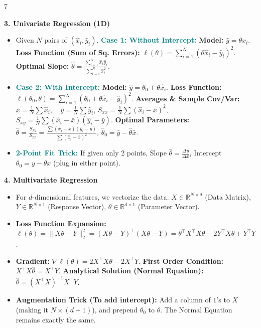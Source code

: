\documentclass{article}
\newcommand{\hlhighlight}[1]{\par\vspace{1.5pt}\noindent\colorbox{yellow!50}{\parbox{\dimexpr\columnwidth-2\fboxsep\relax}{\textbf{#1}}}\par\vspace{0.5pt}}
\newcommand{\sectitle}[1]{\par\textbf{\color{blue!70!black}{#1}}\par}
\newcommand{\concept}[1]{\textcolor{teal}{\textbf{#1}}}
\newcommand{\lbl}[1]{\textcolor{green!60!black}{\textbf{#1}}}
\begin{document}
\begin{multicols}{7}
\hlhighlight{3. Univariate Regression (1D)}
\sectitle{Without Intercept \& With Intercept}
\begin{itemize}
    \item Given $N$ pairs of $(\hat{x}_i, \hat{y}_i)$. \concept{Case 1: Without Intercept:} \lbl{Model:} $\hat{y} = \theta \hat{x}_i$. \lbl{Loss Function (Sum of Sq. Errors):} $\ell(\theta) = \sum_{i=1}^N (\theta\hat{x}_i - \hat{y}_i)^2$. \lbl{Optimal Slope:} $\hat{\theta} = \frac{\sum_{i=1}^N \hat{x}_i \hat{y}_i}{\sum_{i=1}^N \hat{x}_i^2}$.
    \item \concept{Case 2: With Intercept:} \lbl{Model:} $\hat{y} = \theta_0 + \theta \hat{x}_i$. \lbl{Loss Function:} $\ell(\theta_0, \theta) = \sum_{i=1}^N (\theta_0 + \theta\hat{x}_i - \hat{y}_i)^2$. \lbl{Averages \& Sample Cov/Var:} $\bar{x} = \frac{1}{N}\sum \hat{x}_i, \quad \bar{y} = \frac{1}{N}\sum \hat{y}_i$, $S_{xx} = \frac{1}{N}\sum (\hat{x}_i - \bar{x})^2$, $S_{xy} = \frac{1}{N}\sum (\hat{x}_i - \bar{x})(\hat{y}_i - \bar{y})$. \lbl{Optimal Parameters:} $\hat{\theta} = \frac{S_{xy}}{S_{xx}} = \frac{\sum (\hat{x}_i - \bar{x})(\hat{y}_i - \bar{y})}{\sum (\hat{x}_i - \bar{x})^2}$, $\hat{\theta}_0 = \bar{y} - \hat{\theta}\bar{x}$.
    \item \concept{2-Point Fit Trick:} If given only 2 points, Slope $\hat{\theta} = \frac{\Delta y}{\Delta x}$, Intercept $\theta_0 = y - \hat{\theta}x$ (plug in either point).
\end{itemize}

\hlhighlight{4. Multivariate Regression}
\sectitle{Vectorized Form \& Solutions}
\begin{itemize}
    \item For $d$-dimensional features, we vectorize the data. $X \in \mathbb{R}^{N \times d}$ (Data Matrix), $Y \in \mathbb{R}^{N \times 1}$ (Response Vector), $\theta \in \mathbb{R}^{d \times 1}$ (Parameter Vector).
    \item \lbl{Loss Function Expansion:} $\ell(\theta) = \|X\theta - Y\|_2^2 = (X\theta - Y)^\top (X\theta - Y) = \theta^\top X^\top X \theta - 2Y^\top X \theta + Y^\top Y$.
    \item \lbl{Gradient:} $\nabla \ell(\theta) = 2X^\top X \theta - 2X^\top Y$. \lbl{First Order Condition:} $X^\top X \hat{\theta} = X^\top Y$. \lbl{Analytical Solution (Normal Equation):} $\hat{\theta} = (X^\top X)^{-1} X^\top Y$.
    \item \lbl{Augmentation Trick (To add intercept):} Add a column of $1$'s to $X$ (making it $N \times (d+1)$), and prepend $\theta_0$ to $\theta$. The Normal Equation remains exactly the same.
\end{itemize}


\end{multicols}
\end{document}
